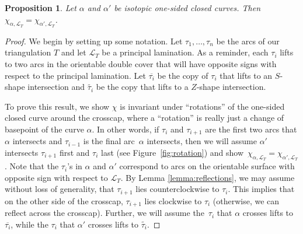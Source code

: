 \documentclass[pdftex]{sigma}
\numberwithin{equation}{section}
\newtheorem{Proposition}[Theorem]{Proposition}
\theoremstyle{definition}
\begin{document}
\begin{Proposition}\label{prop:rotation}
 Let $\alpha$ and $\alpha'$ be isotopic one-sided closed curves. Then $\chi_{\alpha, \mathcal{L}_T}=\chi_{\alpha', \mathcal{L}_T}$.
\end{Proposition}
\begin{proof}
 We begin by setting up some notation. Let $\tau_1, \ldots, \tau_n$ be the arcs of our triangulation $T$ and let $\mathcal{L}_T$ be a principal lamination. As a reminder, each $\tau_i$ lifts to two arcs in the orientable double cover that will have opposite signs with respect to the principal lamination. Let $\overline{\tau_i}$ be the copy of $\tau_i$ that lifts to an $S$-shape intersection and $\widetilde{\tau_i}$ be the copy that lifts to a $Z$-shape intersection.

 To prove this result, we show $\chi$ is invariant under ``rotations'' of the one-sided closed curve around the crosscap, where a ``rotation'' is really just a change of basepoint of the curve $\alpha$. In other words, if $\tau_i$ and $\tau_{i+1}$ are the first two arcs that $\alpha$ intersects and $\tau_{i-1}$ is the final arc~$\alpha$ intersects, then we will assume $\alpha'$ intersects $\tau_{i+1}$ first and $\tau_{i}$ last (see Figure~\ref{fig:rotation}) and show~${\chi_{\alpha, \mathcal{L}_T}=\chi_{\alpha', \mathcal{L}_T}}$. Note that the $\tau_i$'s in $\alpha$ and $\alpha'$ correspond to arcs on the orientable surface with opposite sign with respect to $\mathcal{L}_T$. By Lemma \ref{lemma:reflections}, we may assume without loss of generality, that $\tau_{i+1}$ lies counterclockwise to $\tau_{i}$. This implies that on the other side of the crosscap, $\tau_{i+1}$ lies clockwise to $\tau_{i}$ (otherwise, we can reflect across the crosscap). Further, we will assume the~$\tau_i$ that $\alpha$ crosses lifts to $\overline{\tau_i}$, while the $\tau_i$ that $\alpha'$ crosses lifts to $\widetilde{\tau_i}$.


\end{proof}
\end{document}
